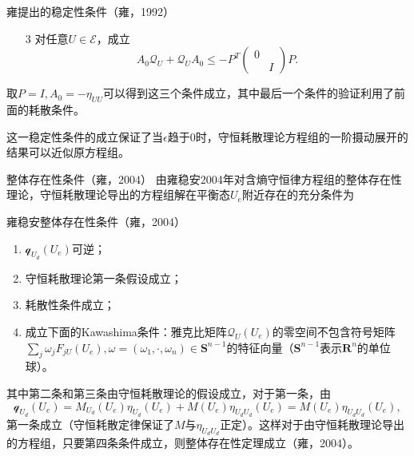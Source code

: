 \documentclass[mathserif]{beamer}
\begin{document}
\begin{frame}{}
\begin{block}{雍提出的稳定性条件（雍，1992）}
	\begin{enumerate}
		\item[3] 对任意$U \in \mathcal{E}$，成立
		\begin{equation*}
			A_0 \mathcal{Q}_U +\mathcal{Q}_U A_0 \le  - P^T \left(\begin{matrix} 0 & \\ & I \end{matrix} \right) P. 
		\end{equation*}
	\end{enumerate}
\end{block}
取$P=I,A_0 = -\eta_{UU}$可以得到这三个条件成立，其中最后一个条件的验证利用了前面的耗散条件。%

这一稳定性条件的成立保证了当$\epsilon$趋于$0$时，守恒耗散理论方程组的一阶摄动展开的结果可以近似原方程组。%
\end{frame}

\begin{frame}{整体存在性条件（雍，2004）}
由雍稳安2004年对含熵守恒律方程组的整体存在性理论，守恒耗散理论导出的方程组解在平衡态$U_e$附近存在的充分条件为
\begin{block}{雍稳安整体存在性条件（雍，2004）}
\begin{enumerate}
\item $\mathcal{q}_{U_d}(U_e)$可逆；
\item 守恒耗散理论第一条假设成立；
\item 耗散性条件成立；
\item 成立下面的Kawashima条件：雅克比矩阵$\mathcal{Q}_U(U_e)$的零空间不包含符号矩阵$\sum_{j} \omega_j F_{jU}(U_e), \omega =(\omega_1, \cdot,\omega_n) \in \mathbf{S}^{n-1}$的特征向量（$\mathbf{S}^{n-1}$表示$\mathbf{R}^n$的单位球）。
\end{enumerate}
\end{block}
{\small 其中第二条和第三条由守恒耗散理论的假设成立，对于第一条，由
\begin{equation*}
	\mathcal{q}_{U_d}(U_e) = M_{U_d}(U_e) \eta_{U_d}(U_e) + M(U_e) \eta_{U_d U_d}(U_e) =  M(U_e) \eta_{U_d U_d}(U_e),
\end{equation*}
第一条成立（守恒耗散定律保证了$M$与$\eta_{U_d U_d}$正定）。这样对于由守恒耗散理论导出的方程组，只要第四条条件成立，则整体存在性定理成立（雍，2004）。}	

\end{frame}
\end{document}
